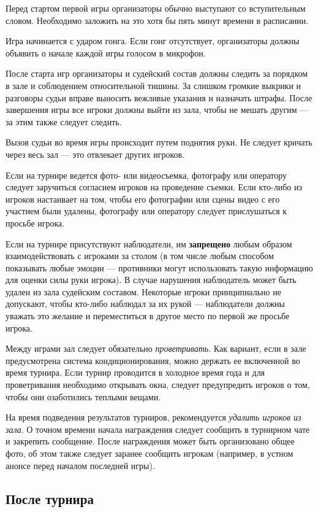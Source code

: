 Перед стартом первой игры организаторы обычно выступают со вступительным словом. Необходимо заложить на это хотя бы пять минут времени в расписании.

Игра начинается с ударом гонга. Если гонг отсутствует, организаторы должны объявить о начале каждой игры голосом в микрофон.

После старта игр организаторы и судейский состав должны следить за порядком в зале и соблюдением относительной тишины. За слишком громкие выкрики и разговоры судьи вправе выносить вежливые указания и назначать штрафы. После завершения игры все игроки должны выйти из зала, чтобы не мешать другим --- за этим также следует следить.

Вызов судьи во время игры происходит путем поднятия руки. Не следует кричать через весь зал --- это отвлекает других игроков.

Если на турнире ведется фото- или видеосъемка, фотографу или оператору следует заручиться согласием игроков на проведение съемки. Если кто-либо из игроков настаивает на том, чтобы его фотографии или сцены видео с его участием были удалены, фотографу или оператору следует прислушаться к просьбе игрока.

Если на турнире присутствуют наблюдатели, им \textbf{запрещено} любым образом взаимодействовать с игроками за столом (в том числе любым способом показывать любые эмоции --- противники могут использовать такую информацию для оценки силы руки игрока). В случае нарушения наблюдатель может быть удален из зала судейским составом. Некоторые игроки принципиально не допускают, чтобы кто-либо наблюдал за их рукой --- наблюдатели должны уважать это желание и переместиться в другое место по первой же просьбе игрока.

Между играми зал следует обязательно \textit{проветривать}. Как вариант, если в зале предусмотрена система кондиционирования, можно держать ее включенной во время турнира. Если турнир проводится в холодное время года и для проветривания необходимо открывать окна, следует предупредить игроков о том, чтобы они озаботились теплыми вещами.

На время подведения результатов турниров, рекомендуется \textit{удалить игроков из зала}. О точном времени начала награждения следует сообщить в турнирном чате и закрепить сообщение. После награждения может быть организовано общее фото, об этом также следует заранее сообщить игрокам (например, в устном анонсе перед началом последней игры).

\subsection{После турнира}

